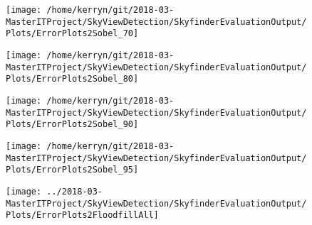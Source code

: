 \documentclass[final,3p,times,authoryear]{elsarticle}
\begin{document}
\begin{figure}
\centering
\texttt{[image: /home/kerryn/git/2018-03-MasterITProject/SkyViewDetection/SkyfinderEvaluationOutput/Plots/ErrorPlots2Sobel\_70]}
\caption{}
\label{fig:errorplots2sobel70}
\end{figure}
\begin{figure}
\centering
\texttt{[image: /home/kerryn/git/2018-03-MasterITProject/SkyViewDetection/SkyfinderEvaluationOutput/Plots/ErrorPlots2Sobel\_80]}
\caption{}
\label{fig:errorplots2sobel80}
\end{figure}
\begin{figure}
\centering
\texttt{[image: /home/kerryn/git/2018-03-MasterITProject/SkyViewDetection/SkyfinderEvaluationOutput/Plots/ErrorPlots2Sobel\_90]}
\caption{}
\label{fig:errorplots2sobel90}
\end{figure}
\begin{figure}
\centering
\texttt{[image: /home/kerryn/git/2018-03-MasterITProject/SkyViewDetection/SkyfinderEvaluationOutput/Plots/ErrorPlots2Sobel\_95]}
\caption{}
\label{fig:errorplots2sobel95}
\end{figure}

\begin{figure}
\centering
\texttt{[image: ../2018-03-MasterITProject/SkyViewDetection/SkyfinderEvaluationOutput/Plots/ErrorPlots2FloodfillAll]}
\caption{}
\label{fig:errorplots2floodfillall}
\end{figure}
\end{document}
